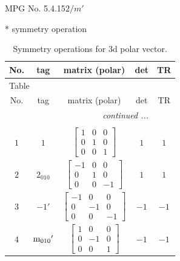 \documentclass[fleqn,8pt]{jsarticle}
\begin{document}
\setcounter{MaxMatrixCols}{32}

\renewcommand{\tablename}{Table~}
\renewcommand{\figurename}{Figure~}
\begin{center}
\LARGE
MPG No. 5.4.15\quad$2/m'$
\end{center}
* symmetry operation
\renewcommand{\arraystretch}{1.3}
\begin{longtable}{ccccc}
\caption{Symmetry operations for 3d polar vector.}
 \\
 \hline \hline
No. & tag & matrix (polar) & det & TR \\ \hline \endfirsthead

\multicolumn{4}{l}{\tablename\ \thetable{}} \\
 \hline \hline
No. & tag & matrix (polar) & det & TR \\ \hline \endhead

 \hline \hline
\multicolumn{4}{r}{\footnotesize\it continued ...} \\ \endfoot

 \hline \hline
\multicolumn{4}{r}{} \\ \endlastfoot

$ 1 $ & $ 1 $ & $ \begin{bmatrix} 1 & 0 & 0 \\ 0 & 1 & 0 \\ 0 & 0 & 1 \end{bmatrix} $ & $ 1 $ & $ 1 $ \\ \hline
$ 2 $ & $ 2{}_{010} $ & $ \begin{bmatrix} -1 & 0 & 0 \\ 0 & 1 & 0 \\ 0 & 0 & -1 \end{bmatrix} $ & $ 1 $ & $ 1 $ \\ \hline
$ 3 $ & $ -1{}' $ & $ \begin{bmatrix} -1 & 0 & 0 \\ 0 & -1 & 0 \\ 0 & 0 & -1 \end{bmatrix} $ & $ -1 $ & $ -1 $ \\ \hline
$ 4 $ & $ {\rm m}_{010}{}' $ & $ \begin{bmatrix} 1 & 0 & 0 \\ 0 & -1 & 0 \\ 0 & 0 & 1 \end{bmatrix} $ & $ -1 $ & $ -1 $ \\
\end{longtable}
\end{document}
